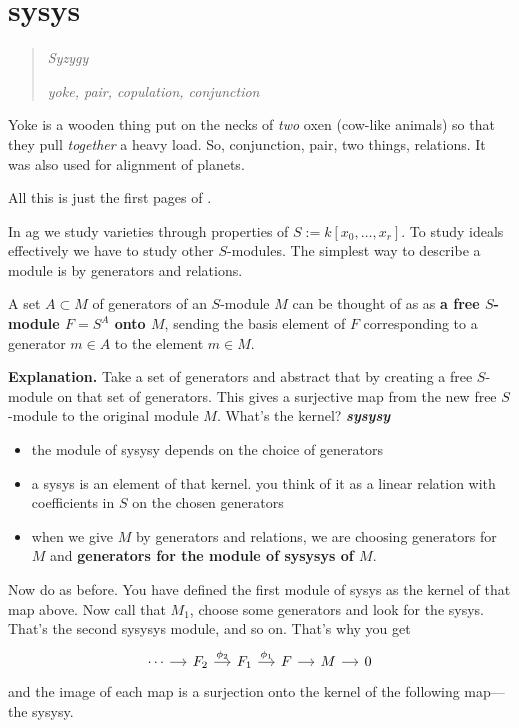 \section{sysys}

\begin{quote}
\hfill \textit{Syzygy} %

\hfill\textit{yoke, pair, copulation, conjunction}
\end{quote}

Yoke is a wooden thing put on the necks of \textit{two} oxen (cow-like animals) so that they pull \textit{together} a heavy load. So, conjunction, pair, two things, relations. It was also used for alignment of planets.

All this is just the first pages of \cite{sys}.

In ag we study varieties through properties of \(S:=k[x_0,\ldots,x_r]\). To study ideals effectively we have to study other \(S\)-modules. The simplest way to describe a module is by generators and relations.

A set \(A \subset M\) of generators of an \(S\)-module \(M\) can be thought of as as \textbf{a free \(S\)-module \(F=S^A\) onto \(M\)}, sending the basis element of \(F\) corresponding to a generator \(m \in A\) to the element \(m \in M\).

\textbf{Explanation.} Take a set of generators and abstract that by creating a free \(S\)-module on that set of generators. This gives a surjective map from the new free \(S\)-module to the original module \(M\). What's the kernel? \textit{\textbf{sysysy}}

\begin{itemize}
\item the module of sysysy depends on the choice of generators
\item a sysys is an element of that kernel. you think of it as a linear relation with coefficients in \(S\) on the chosen generators
\item when we give \(M\) by generators and relations, we are choosing generators for \(M\) and \textbf{generators for the module of sysysys of \(M\)}.
\end{itemize}

Now do as before. You have defined the first module of sysys as the kernel of that map above. Now call that \(M_1\), choose some generators and look for the sysys. That's the second sysysys module, and so on. That's why you get
\[\begin{tikzcd}[column sep=small]
	\cdots\arrow[r]&F_2\arrow[r,"\phi_2"]&F_1\arrow[r,"\phi_1"]&F\arrow[r]&M\arrow[r]&0
\end{tikzcd}\]
and the image of each map is a surjection onto the kernel of the following map---the sysysy.


